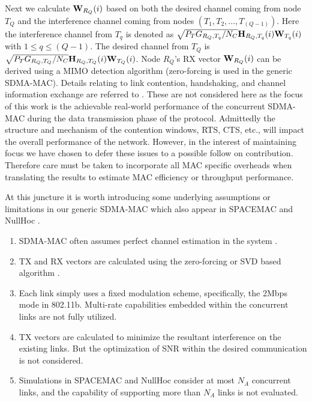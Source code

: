 \documentclass[journal, final]{IEEEtran}
\begin{document}
Next we calculate ${\rm {\bf W}}_{R_Q } (i)$ based on both the desired
channel coming from node $T_Q $ and the interference channel coming from
nodes $(T_1 ,T_2 ,...,T_{(Q - 1)} )$. Here the interference channel from
$T_q $ is denoted as $\sqrt {P_T G_{R_Q ,T_q } / N_C } {\rm {\bf H}}_{R_Q
,T_q } (i){\rm {\bf W}}_{T_q } (i)$ with $1 \le q \le (Q - 1)$. The desired
channel from $T_Q $ is $\sqrt {P_T G_{R_Q ,T_Q } / N_C } {\rm {\bf H}}_{R_Q
,T_Q } (i){\rm {\bf W}}_{T_Q } (i)$. Node $R_Q $'s RX vector ${\rm {\bf
W}}_{R_Q } (i)$ can be derived using a MIMO detection algorithm
(zero-forcing is used in the generic SDMA-MAC). Details relating to link contention,
handshaking, and channel information exchange are referred to \cite{1_SPACEMAC, 2_MIMOMAN, 3_NULLHOC}. These
are not considered here as the focus of this work is the achievable
real-world performance of the concurrent SDMA-MAC during the data
transmission phase of the protocol. Admittedly the structure and mechanism
of the contention windows, RTS, CTS, etc., will impact the overall
performance of the network. However, in the interest of maintaining focus we have chosen to defer these issues to a possible follow on contribution.  Therefore care must be taken to incorporate all MAC specific overheads when translating the results to estimate MAC efficiency or throughput performance.

At this juncture it is worth introducing some underlying assumptions or
limitations in our generic SDMA-MAC which also appear in SPACEMAC \cite{1_SPACEMAC, 2_MIMOMAN} and
NullHoc \cite{3_NULLHOC, 4_nullhoc}.
\begin{enumerate}
\item SDMA-MAC often assumes perfect channel estimation in the system \cite{1_SPACEMAC, 2_MIMOMAN}.
\item TX and RX vectors are calculated using the zero-forcing or SVD
based algorithm \cite{1_SPACEMAC, 2_MIMOMAN, 3_NULLHOC, 4_nullhoc}.
\item Each link simply uses a fixed modulation scheme, specifically,
the 2Mbps mode in 802.11b. Multi-rate capabilities embedded within the concurrent links are not fully
utilized.
\item TX vectors are calculated to minimize the resultant interference on the
existing links. But the optimization of SNR within the desired
communication is not considered.
\item Simulations in SPACEMAC and NullHoc consider at most $N_A $ concurrent
links, and the capability of supporting more than $N_A $ links is not
evaluated.
\end{enumerate}
\end{document}

